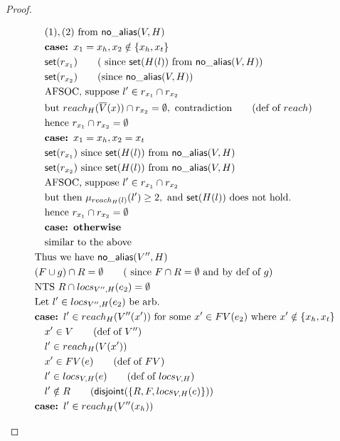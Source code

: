 \documentclass[11pt]{article}
\newcommand{\ms}[1]{\ensuremath{\mathsf{#1}}}
\newcommand{\na}[1]{\mathsf{no\_alias}(#1)}
\newcommand{\dist}[1]{\mathsf{disjoint}(#1)}
\begin{document}
\begin{proof}
\begin{description}
\begin{align*}
  &\quad (1), (2) \text{ from } \na{V,H}\\
  &\quad \textbf{case: } x_1 = x_h, x_2 \notin \{x_h,x_t\}\\
  &\quad \ms{set}(r_{x_1}) \tag{ since $\ms{set}(H(l))$ from  $\na{V,H}$}\\
  &\quad \ms{set}(r_{x_2}) \tag{since  $\na{V,H}$}\\
  &\quad \text{AFSOC, suppose } l' \in r_{x_1} \cap r_{x_2}\\
  &\quad \text{but } reach_H(\overline V(x)) \cap r_{x_2} = \emptyset, \text{ contradiction} \tag{def of $reach$}\\
  &\quad \text{hence } r_{x_1} \cap r_{x_2} = \emptyset\\
  &\quad \textbf{case: } x_1 = x_h, x_2 = x_t\\
  &\quad \ms{set}(r_{x_1}) \text{ since } \ms{set}(H(l)) \text{ from } \na{V,H}\\
  &\quad \ms{set}(r_{x_2}) \text{ since } \ms{set}(H(l)) \text{ from } \na{V,H}\\
  &\quad \text{AFSOC, suppose } l' \in r_{x_1} \cap r_{x_2}\\
  &\quad \text{but then } \mu_{reach_H(l)}(l') \ge 2, \text{ and } \ms{set}(H(l)) \text{ does not hold}.\\
  &\quad \text{hence } r_{x_1} \cap r_{x_2} = \emptyset\\
  &\quad \textbf{case: otherwise} \\
  &\quad \text{similar to the above}\\
  &\text{Thus we have } \na{V'',H}\\
  &(F \cup g) \cap R = \emptyset \tag{ since $F \cap R = \emptyset$ and by def of $g$}\\
  &\text{NTS } R \cap locs_{V'',H}(e_2) = \emptyset\\
  &\text{Let } l' \in locs_{V'',H}(e_2) \text{ be arb.}\\
  &\textbf{case: }  l' \in reach_{H}(V''(x')) \text{ for some $x' \in FV(e_2)$ where } x' \notin \{x_h,x_t\}\\
  &\quad x' \in V \tag{def of $V''$}\\
  &\quad l' \in reach_{H}(V(x'))\\
  &\quad x' \in FV(e) \tag{def of $FV$}\\
  &\quad l' \in locs_{V,H}(e) \tag{def of $locs_{V,H}$}\\
  &\quad l' \notin R \tag{$\dist{\{R,F,locs_{V,H}(e)\}}$}\\
  &\textbf{case: }  l' \in reach_{H}(V''(x_h)) \\

\end{align*}
\end{description}
\end{proof}
\end{document}
